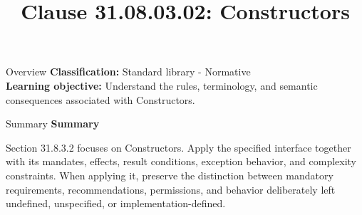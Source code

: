 \documentclass[10pt,letterpaper]{article}
\title{Clause 31.08.03.02: Constructors}
\author{}
\date{}
\begin{document}
\maketitle
\begin{CornellOverviewBox}{Overview}
\textbf{Classification:} Standard library - Normative\\[2pt]
\textbf{Learning objective:} Understand the rules, terminology, and semantic consequences associated with Constructors.
\end{CornellOverviewBox}\begin{CornellSummaryBox}{Summary}
{\sffamily\bfseries\color{Accent} Summary}\par\vspace{3pt}Section 31.8.3.2 focuses on Constructors. Apply the specified interface together with its mandates, effects, result conditions, exception behavior, and complexity constraints. When applying it, preserve the distinction between mandatory requirements, recommendations, permissions, and behavior deliberately left undefined, unspecified, or implementation-defined.
\end{CornellSummaryBox}
\end{document}
